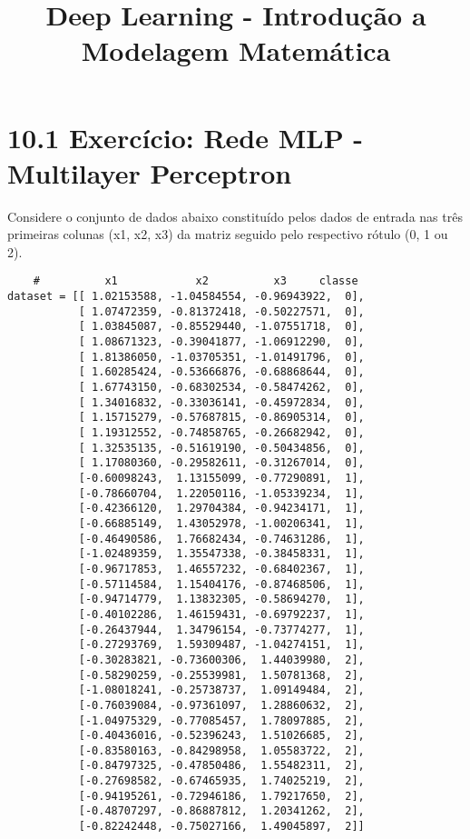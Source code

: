 \documentclass{article}
\title{Deep Learning - Introdução a Modelagem Matemática}
\author{}
\date{}
\begin{document}
\maketitle

\section*{10.1 Exercício: Rede MLP - Multilayer Perceptron}

Considere o conjunto de dados abaixo constituído pelos dados de entrada nas três primeiras colunas (x1, x2, x3) da matriz seguido pelo respectivo rótulo (0, 1 ou 2).


\begin{center}
    \begin{verbatim}
    #          x1            x2          x3     classe
dataset = [[ 1.02153588, -1.04584554, -0.96943922,  0], 
           [ 1.07472359, -0.81372418, -0.50227571,  0], 
           [ 1.03845087, -0.85529440, -1.07551718,  0], 
           [ 1.08671323, -0.39041877, -1.06912290,  0], 
           [ 1.81386050, -1.03705351, -1.01491796,  0], 
           [ 1.60285424, -0.53666876, -0.68868644,  0], 
           [ 1.67743150, -0.68302534, -0.58474262,  0], 
           [ 1.34016832, -0.33036141, -0.45972834,  0], 
           [ 1.15715279, -0.57687815, -0.86905314,  0], 
           [ 1.19312552, -0.74858765, -0.26682942,  0], 
           [ 1.32535135, -0.51619190, -0.50434856,  0], 
           [ 1.17080360, -0.29582611, -0.31267014,  0], 
           [-0.60098243,  1.13155099, -0.77290891,  1], 
           [-0.78660704,  1.22050116, -1.05339234,  1], 
           [-0.42366120,  1.29704384, -0.94234171,  1], 
           [-0.66885149,  1.43052978, -1.00206341,  1], 
           [-0.46490586,  1.76682434, -0.74631286,  1], 
           [-1.02489359,  1.35547338, -0.38458331,  1], 
           [-0.96717853,  1.46557232, -0.68402367,  1], 
           [-0.57114584,  1.15404176, -0.87468506,  1], 
           [-0.94714779,  1.13832305, -0.58694270,  1], 
           [-0.40102286,  1.46159431, -0.69792237,  1], 
           [-0.26437944,  1.34796154, -0.73774277,  1], 
           [-0.27293769,  1.59309487, -1.04274151,  1], 
           [-0.30283821, -0.73600306,  1.44039980,  2], 
           [-0.58290259, -0.25539981,  1.50781368,  2], 
           [-1.08018241, -0.25738737,  1.09149484,  2], 
           [-0.76039084, -0.97361097,  1.28860632,  2], 
           [-1.04975329, -0.77085457,  1.78097885,  2], 
           [-0.40436016, -0.52396243,  1.51026685,  2], 
           [-0.83580163, -0.84298958,  1.05583722,  2], 
           [-0.84797325, -0.47850486,  1.55482311,  2], 
           [-0.27698582, -0.67465935,  1.74025219,  2], 
           [-0.94195261, -0.72946186,  1.79217650,  2], 
           [-0.48707297, -0.86887812,  1.20341262,  2], 
           [-0.82242448, -0.75027166,  1.49045897,  2]]
    \end{verbatim}
\end{center}
\end{document}
